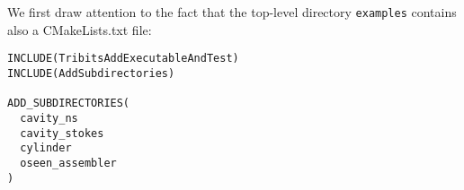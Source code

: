 %
%
%
%
%
%
%
%
%
%
%
%
%
%
%
%
%



We first draw attention to the fact that the top-level directory \verb+examples+ contains also a CMakeLists.txt file:
\begin{verbatim}
INCLUDE(TribitsAddExecutableAndTest)
INCLUDE(AddSubdirectories)

ADD_SUBDIRECTORIES(
  cavity_ns
  cavity_stokes
  cylinder
  oseen_assembler
)
\end{verbatim}


